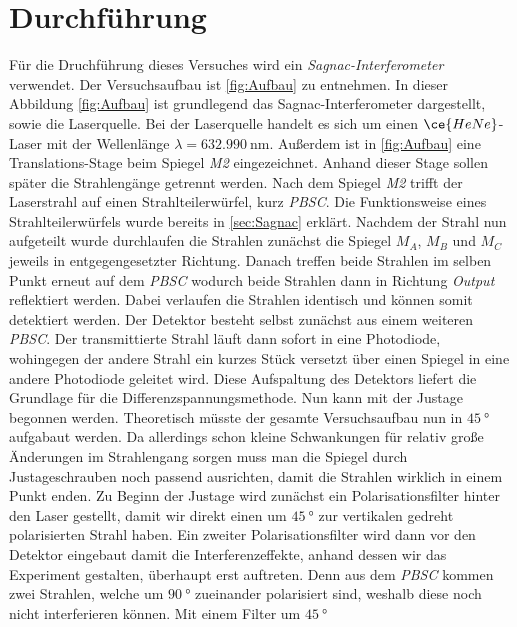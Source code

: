\chapter{Durchführung}
\label{cha:Durchführung}
Für die Druchführung dieses Versuches wird ein \textit{Sagnac-Interferometer} verwendet. Der Versuchsaufbau ist \autoref{fig:Aufbau} zu entnehmen. In dieser Abbildung \ref{fig:Aufbau}
ist grundlegend das Sagnac-Interferometer dargestellt, sowie die Laserquelle. Bei der Laserquelle handelt es sich um einen $\ce{HeNe}$-Laser mit der Wellenlänge $\lambda = \qty{632.990}{\nano\metre}$\cite{v64}.
Außerdem ist in \autoref{fig:Aufbau} eine Translations-Stage beim Spiegel \textit{M2} eingezeichnet. Anhand dieser Stage sollen später die Strahlengänge getrennt werden. Nach dem
Spiegel \textit{M2} trifft der Laserstrahl auf einen Strahlteilerwürfel, kurz \textit{PBSC}. Die Funktionsweise eines Strahlteilerwürfels wurde bereits in \autoref{sec:Sagnac} erklärt.
Nachdem der Strahl nun aufgeteilt wurde durchlaufen die Strahlen zunächst die Spiegel $\textit{M}_A$, $\textit{M}_B$ und $\textit{M}_C$ jeweils in entgegengesetzter Richtung. 
Danach treffen beide Strahlen im selben Punkt erneut auf dem \textit{PBSC} wodurch beide Strahlen dann in Richtung \textit{Output} reflektiert werden. Dabei verlaufen die Strahlen 
identisch und können somit detektiert werden. Der Detektor besteht selbst zunächst aus einem weiteren \textit{PBSC}. Der transmittierte Strahl läuft dann sofort in eine Photodiode,
wohingegen der andere Strahl ein kurzes Stück versetzt über einen Spiegel in eine andere Photodiode geleitet wird. Diese Aufspaltung des Detektors liefert die Grundlage für die 
Differenzspannungsmethode. Nun kann mit der Justage begonnen werden. Theoretisch müsste der gesamte Versuchsaufbau nun in $\qty{45}{\degree}$ aufgabaut werden. Da allerdings schon
kleine Schwankungen für relativ große Änderungen im Strahlengang sorgen muss man die Spiegel durch Justageschrauben noch passend ausrichten, damit die Strahlen wirklich in einem 
Punkt enden. Zu Beginn der Justage wird zunächst ein Polarisationsfilter hinter den Laser gestellt, damit wir direkt einen um $\qty{45}{\degree}$ zur vertikalen gedreht polarisierten
Strahl haben.  Ein zweiter Polarisationsfilter wird dann vor den Detektor eingebaut damit die Interferenzeffekte, anhand dessen wir das Experiment gestalten, überhaupt erst auftreten.
Denn aus dem \textit{PBSC} kommen zwei Strahlen, welche um $\qty{90}{\degree}$ zueinander polarisiert sind, weshalb diese noch nicht interferieren können. Mit einem Filter um $\qty{45}{\degree}$
